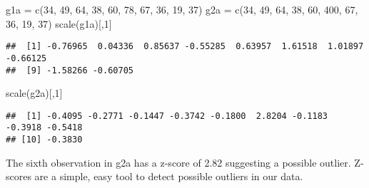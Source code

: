 \documentclass[
  ignorenonframetext,
]{beamer}
\newenvironment{Shaded}{\begin{snugshade}}{\end{snugshade}}
\newcommand{\DecValTok}[1]{\textcolor[rgb]{0.00,0.00,0.81}{#1}}
\newcommand{\FunctionTok}[1]{\textcolor[rgb]{0.00,0.00,0.00}{#1}}
\newcommand{\NormalTok}[1]{#1}
\newcommand{\OtherTok}[1]{\textcolor[rgb]{0.56,0.35,0.01}{#1}}
\begin{document}
\begin{frame}[fragile]
\begin{Shaded}
\begin{Highlighting}[]
\NormalTok{g1a }\OtherTok{=} \FunctionTok{c}\NormalTok{(}\DecValTok{34}\NormalTok{, }\DecValTok{49}\NormalTok{, }\DecValTok{64}\NormalTok{, }\DecValTok{38}\NormalTok{, }\DecValTok{60}\NormalTok{, }\DecValTok{78}\NormalTok{, }\DecValTok{67}\NormalTok{, }\DecValTok{36}\NormalTok{, }\DecValTok{19}\NormalTok{, }\DecValTok{37}\NormalTok{) }
\NormalTok{g2a }\OtherTok{=} \FunctionTok{c}\NormalTok{(}\DecValTok{34}\NormalTok{, }\DecValTok{49}\NormalTok{, }\DecValTok{64}\NormalTok{, }\DecValTok{38}\NormalTok{, }\DecValTok{60}\NormalTok{, }\DecValTok{400}\NormalTok{, }\DecValTok{67}\NormalTok{, }\DecValTok{36}\NormalTok{, }\DecValTok{19}\NormalTok{, }\DecValTok{37}\NormalTok{) }
\FunctionTok{scale}\NormalTok{(g1a)[,}\DecValTok{1}\NormalTok{]}
\end{Highlighting}
\end{Shaded}

\begin{verbatim}
##  [1] -0.76965  0.04336  0.85637 -0.55285  0.63957  1.61518  1.01897 -0.66125
##  [9] -1.58266 -0.60705
\end{verbatim}

\begin{Shaded}
\begin{Highlighting}[]
\FunctionTok{scale}\NormalTok{(g2a)[,}\DecValTok{1}\NormalTok{]}
\end{Highlighting}
\end{Shaded}

\begin{verbatim}
##  [1] -0.4095 -0.2771 -0.1447 -0.3742 -0.1800  2.8204 -0.1183 -0.3918 -0.5418
## [10] -0.3830
\end{verbatim}

The sixth observation in g2a has a z-score of 2.82 suggesting a possible
outlier. Z-scores are a simple, easy tool to detect possible outliers in
our data.
\end{frame}
\end{document}
